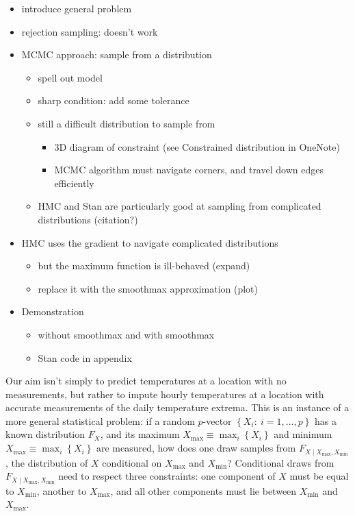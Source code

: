 \documentclass[letter]{article}
\providecommand{\tightlist}{%
      \setlength{\itemsep}{0pt}\setlength{\parskip}{0pt}}
\newcommand{\genericdel}[3]{%
      \left#1#3\right#2
    }
\newcommand{\cbr}[1]{\genericdel\{\}{#1}}
\newcommand{\Xmax}{X_{\max}}
\newcommand{\Xmin}{X_{\min}}
\newcommand{\Fcond}{F_{X \mid \Xmax,\Xmin}}
\providecommand{\tightlist}{%
  	  \setlength{\itemsep}{0pt}\setlength{\parskip}{0pt}}
\begin{document}
        \begin{itemize}
\tightlist
\item
  introduce general problem
\item
  rejection sampling: doesn't work
\item
  MCMC approach: sample from a distribution

  \begin{itemize}
  \tightlist
  \item
    spell out model
  \item
    sharp condition: add some tolerance
  \item
    still a difficult distribution to sample from

    \begin{itemize}
    \tightlist
    \item
      3D diagram of constraint (see Constrained distribution in OneNote)
    \item
      MCMC algorithm must navigate corners, and travel down edges efficiently
    \end{itemize}
  \item
    HMC and Stan are particularly good at sampling from complicated distributions (citation?)
  \end{itemize}
\item
  HMC uses the gradient to navigate complicated distributions

  \begin{itemize}
  \tightlist
  \item
    but the maximum function is ill-behaved (expand)
  \item
    replace it with the smoothmax approximation (plot)
  \end{itemize}
\item
  Demonstration

  \begin{itemize}
  \tightlist
  \item
    without smoothmax and with smoothmax
  \item
    Stan code in appendix
  \end{itemize}
\end{itemize}
    


        Our aim isn't simply to predict temperatures at a location with no measurements, but rather to impute hourly temperatures at a location with accurate measurements of the daily temperature extrema.
This is an instance of a more general statistical problem: if a random \(p\)-vector \(\cbr{X_i:~i=1,\ldots,p}\) has a known distribution \(F_X\), and its maximum \(\Xmax \equiv \max_i\cbr{X_i}\) and minimum \(\Xmax \equiv \max_i\cbr{X_i}\) are measured, how does one draw samples from \(\Fcond\), the distribution of \(X\) conditional on \(\Xmax\) and \(\Xmin\)?
Conditional draws from \(\Fcond\) need to respect three constraints: one component of \(X\) must be equal to \(\Xmin\), another to \(\Xmax\), and all other components must lie between \(\Xmin\) and \(\Xmax\).
    
\end{document}
